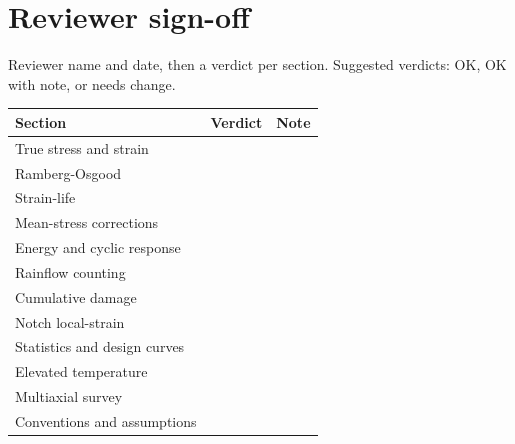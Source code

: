 \documentclass[11pt]{article}
\begin{document}
\section{Reviewer sign-off}
Reviewer name and date, then a verdict per section. Suggested verdicts: OK, OK
with note, or needs change.

\begin{table}[h]
\centering
\small
\begin{tabular}{p{6.5cm} p{2.5cm} p{5cm}}
\toprule
Section & Verdict & Note \\
\midrule
True stress and strain & & \\
Ramberg-Osgood & & \\
Strain-life & & \\
Mean-stress corrections & & \\
Energy and cyclic response & & \\
Rainflow counting & & \\
Cumulative damage & & \\
Notch local-strain & & \\
Statistics and design curves & & \\
Elevated temperature & & \\
Multiaxial survey & & \\
Conventions and assumptions & & \\
\bottomrule
\end{tabular}
\end{table}
\end{document}
